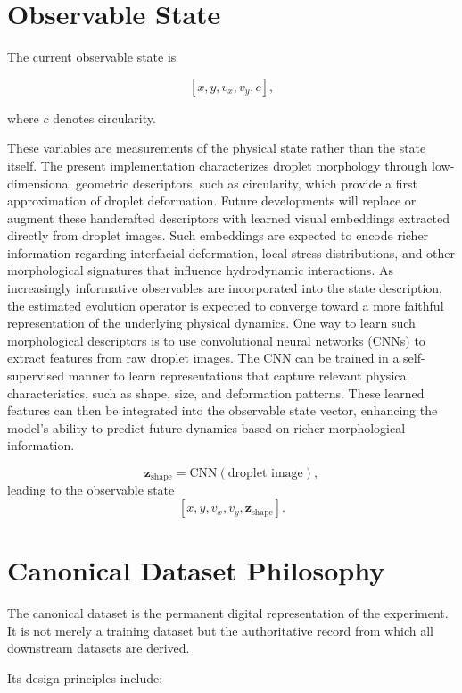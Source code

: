 \documentclass[11pt]{article}
\begin{document}
\section{Observable State}

The current observable state is

\[
[x,y,v_x,v_y,c],
\]

where $c$ denotes circularity.

These variables are measurements of the physical state rather than the state
itself.
The present implementation characterizes droplet morphology through 
low-dimensional geometric descriptors, such as circularity, which provide 
a first approximation of droplet deformation. Future developments will 
replace or augment these handcrafted descriptors with learned visual 
embeddings extracted directly from droplet images. Such embeddings are 
expected to encode richer information regarding interfacial deformation, 
local stress distributions, and other morphological signatures that influence 
hydrodynamic interactions. As increasingly informative observables are 
incorporated into the state description, the estimated evolution operator 
is expected to converge toward a more faithful representation of the 
underlying physical dynamics.
One way to learn such morphological descriptors is to use 
convolutional neural networks (CNNs) to extract features from raw droplet images. 
The CNN can be trained in a self-supervised manner to learn representations that 
capture relevant physical characteristics, such as shape, size, and 
deformation patterns. These learned features can then be integrated into the 
observable state vector, enhancing the model's ability to predict future 
dynamics based on richer morphological information.

\[
\mathbf{z}_{\mathrm{shape}} = \mathrm{CNN}(\text{droplet image}),
\]
leading to the observable state
\[
[x, y, v_x, v_y, \mathbf{z}_{\mathrm{shape}}].
\]



\section{Canonical Dataset Philosophy}

The canonical dataset is the permanent digital representation of the
experiment. It is not merely a training dataset but the authoritative record
from which all downstream datasets are derived.

Its design principles include:
\end{document}
